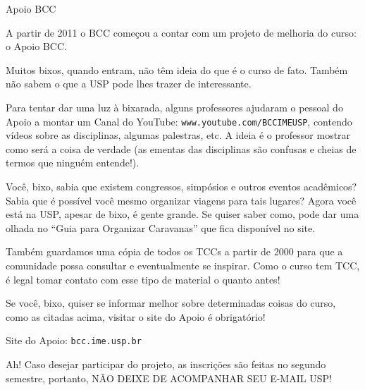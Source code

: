 \begin{subsubsecao}{Apoio BCC}

A partir de 2011 o BCC começou a contar com um projeto de melhoria do curso: o Apoio BCC.

Muitos bixos, quando entram, não têm ideia do que é o curso de fato. Também não 
sabem o que a USP pode lhes trazer de interessante.

Para tentar dar uma luz à bixarada, alguns professores ajudaram o pessoal do
Apoio a montar um Canal do YouTube: {\tt www.youtube.com/BCCIMEUSP}, contendo vídeos sobre as disciplinas, algumas palestras, etc. A ideia é o professor mostrar como será 
a coisa de verdade (as ementas das disciplinas são confusas e cheias de termos 
que ninguém entende!).

Você, bixo, sabia que existem congressos, simpósios e outros eventos acadêmicos? 
Sabia que é possível você mesmo organizar viagens para tais lugares? Agora você 
está na USP, apesar de bixo, é gente grande. Se quiser saber como, pode dar uma 
olhada no ``Guia para Organizar Caravanas'' que fica disponível no site.

Também guardamos uma cópia de todos os TCCs a partir de 2000 para que a 
comunidade possa consultar e eventualmente se inspirar. Como o curso tem TCC, é 
legal tomar contato com esse tipo de material o quanto antes!

Se você, bixo, quiser se informar melhor sobre determinadas coisas do curso, 
como as citadas acima, visitar o site do Apoio é obrigatório!

Site do Apoio: {\tt bcc.ime.usp.br}

Ah! Caso desejar participar do projeto, as inscrições são feitas no segundo 
semestre, portanto, NÃO DEIXE DE ACOMPANHAR SEU E-MAIL USP!
\end{subsubsecao}
